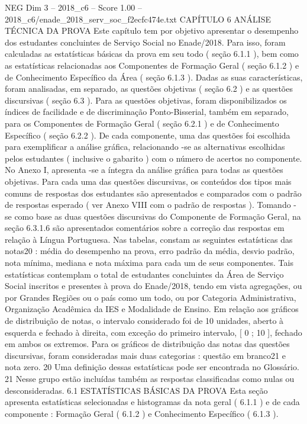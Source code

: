 \begin{textsample}{NEG Dim 3 – 2018\_c6 – Score 1.00 – 2018\_c6/enade\_2018\_serv\_soc\_f2ecfc474e.txt}  \label{ex:f3_neg_167}
CAPÍTULO 6 ANÁLISE TÉCNICA DA PROVA Este capítulo tem por objetivo apresentar o desempenho dos estudantes concluintes de Serviço Social no Enade/2018.
Para isso, foram calculadas as estatísticas básicas da prova em seu todo ( seção 6.1.1 ), bem como as estatísticas relacionadas aos Componentes de Formação Geral ( seção 6.1.2 ) e de Conhecimento Específico da Área ( seção 6.1.3 ).
Dadas as suas características, foram analisadas, em separado, as questões objetivas ( seção 6.2 ) e as questões discursivas ( seção 6.3 ).
Para as questões objetivas, foram disponibilizados os índices de facilidade e de discriminação Ponto-Bisserial, também em separado, para os Componentes de Formação Geral ( seção 6.2.1 ) e de Conhecimento Específico ( seção 6.2.2 ).
De cada componente, uma das questões foi escolhida para exemplificar a análise gráfica, relacionando -se as alternativas escolhidas pelos estudantes ( inclusive o gabarito ) com o número de acertos no componente.
No Anexo I, apresenta -se a íntegra da análise gráfica para todas as questões objetivas.
Para cada uma das questões discursivas, os conteúdos dos tipos mais comuns de respostas dos estudantes são apresentados e comparados com o padrão de respostas esperado ( ver Anexo VIII com o padrão de respostas ).
Tomando -se como base as duas questões discursivas do Componente de Formação Geral, na seção 6.3.1.6 são apresentados comentários sobre a correção das respostas em relação à Língua Portuguesa.
Nas tabelas, constam as seguintes estatísticas das notas20 : média do desempenho na prova, erro padrão da média, desvio padrão, nota mínima, mediana e nota máxima para cada um de seus componentes.
Tais estatísticas contemplam o total de estudantes concluintes da Área de Serviço Social inscritos e presentes à prova do Enade/2018, tendo em vista agregações, ou por Grandes Regiões ou o país como um todo, ou por Categoria Administrativa, Organização Acadêmica da IES e Modalidade de Ensino.
Em relação aos gráficos de distribuição de notas, o intervalo considerado foi de 10 unidades, aberto à esquerda e fechado à direita, com exceção do primeiro intervalo, [ 0 ; 10 ], fechado em ambos os extremos.
Para os gráficos de distribuição das notas das questões discursivas, foram consideradas mais duas categorias : questão em branco21 e nota zero. 20 Uma definição dessas estatísticas pode ser encontrada no Glossário. 21 Nesse grupo estão incluídas também as respostas classificadas como nulas ou desconsideradas. 6.1 ESTATÍSTICAS BÁSICAS DA PROVA Esta seção apresenta estatísticas selecionadas e histogramas da nota geral ( 6.1.1 ) e de cada componente : Formação Geral ( 6.1.2 ) e Conhecimento Específico ( 6.1.3 ).

\end{textsample}
